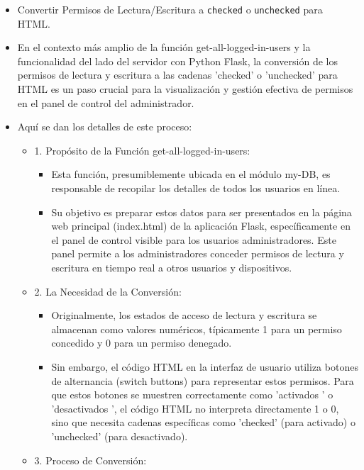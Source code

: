 \documentclass{report}
\begin{document}
\begin{itemize}
    \item Convertir Permisos de Lectura/Escritura a \texttt{checked} o \texttt{unchecked} para HTML.
    \item En el contexto más amplio de la función get-all-logged-in-users y la funcionalidad del lado del servidor con Python Flask, la conversión de los 
    permisos de lectura y escritura a las cadenas 'checked' o 'unchecked' para HTML es un paso crucial para la visualización y gestión efectiva de permisos 
    en el panel de control del administrador.
    \item Aquí se dan los detalles de este proceso:
    \begin{itemize}
        \item 1. Propósito de la Función get-all-logged-in-users:
            \begin{itemize}
                \item Esta función, presumiblemente ubicada en el módulo my-DB, es responsable de recopilar los detalles de todos los usuarios en línea.
                \item Su objetivo es preparar estos datos para ser presentados en la página web principal (index.html) de la aplicación Flask, 
                específicamente en el panel de control visible para los usuarios administradores. Este panel permite a los administradores conceder 
                permisos de lectura y escritura en tiempo real a otros usuarios y dispositivos.
            \end{itemize}
        \item 2. La Necesidad de la Conversión:
            \begin{itemize}
                \item Originalmente, los estados de acceso de lectura y escritura se almacenan como valores numéricos, típicamente 1 para un permiso concedido 
                y 0 para un permiso denegado.
                \item Sin embargo, el código HTML en la interfaz de usuario utiliza botones de alternancia (switch buttons) para representar estos permisos. 
                Para que estos botones se muestren correctamente como  'activados ' o  'desactivados ', el código HTML no interpreta directamente 1 o 0, 
                sino que necesita cadenas específicas como 'checked' (para activado) o 'unchecked' (para desactivado).
            \end{itemize}
        \item 3. Proceso de Conversión:
            \begin{itemize}

\end{itemize}
\end{itemize}
\end{itemize}
\end{document}
